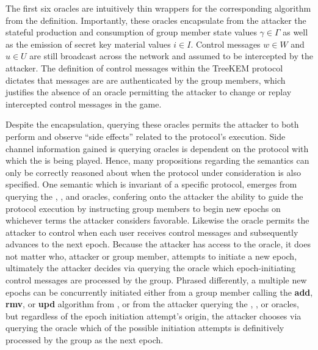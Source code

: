 The first six oracles are intuitively thin wrappers for the corresponding algorithm from the \CGKAdef definition.
Importantly, these oracles encapsulate from the attacker the stateful production and consumption of group member state values \(\gamma \in \Gamma\) as well as the emission of secret key material values \(i \in I\).
Control messages \(w \in W\) and \(u \in U\) are still broadcast across the network and assumed to be intercepted by the attacker.
The definition of control messages within the TreeKEM protocol dictates that messages are are authenticated by the group members, which justifies the absence of an oracle permitting the attacker to change or replay intercepted control messages in the  game.

Despite the encapsulation, querying these oracles permits the attacker to both perform and observe ``side effects'' related to the protocol's execution.
Side channel information gained is querying oracles is dependent on the protocol with which the \CGKAsec is being played.
Hence, many propositions regarding the \CGKAsec semantics can only be correctly reasoned about when the protocol under consideration is also specified.
One semantic which is invariant of a specific protocol, emerges from querying the , , and  oracles, confering onto the attacker the ability to guide the protocol execution by instructing group members to begin new epochs on whichever terms the attacker considers favorable.
Likewise the  oracle permits the attacker to control when each user receives control messages and subsequently advances to the next epoch.
Because the attacker has access to the  oracle, it does not matter who, attacker or group member, attempts to initiate a new epoch, ultimately the attacker decides via querying the  oracle which epoch-initiating control messages are processed by the group.
Phrased differently, a multiple new epochs can be concurrently initiated either from a group member calling the \textbf{add}, \textbf{rmv}, or \textbf{upd} algorithm from \CGKAdef, or from the attacker querying the , , or  oracles, but regardless of the epoch initiation attempt's origin, the attacker chooses via querying the  oracle which of the possible initiation attempts is definitively processed by the group as the next epoch.

